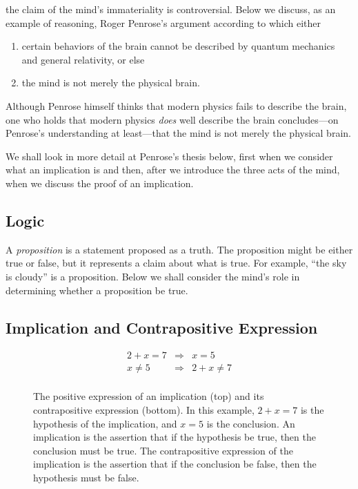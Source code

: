 the claim of the mind's immateriality is controversial.  Below we discuss, as
an example of reasoning, Roger Penrose's argument according to which either
\begin{enumerate}
   \item certain behaviors of the brain cannot be described by quantum
      mechanics and general relativity, or else
   \item the mind is not merely the physical brain.
\end{enumerate}
Although Penrose himself thinks that modern physics fails to describe the
brain, one who holds that modern physics \emph{does} well describe the brain
concludes---on Penrose's understanding at least---that the mind is not merely
the physical brain.

We shall look in more detail at Penrose's thesis below, first when we consider
what an implication is and then, after we introduce the three acts of the mind,
when we discuss the proof of an implication.

\subsection{Logic}

A \emph{proposition} is a statement proposed as a truth. The proposition might
be either true or false, but it represents a claim about what is true. For
example, ``the sky is cloudy'' is a proposition. Below we shall consider the
mind's role in determining whether a proposition be true.

\subsection{Implication and Contrapositive Expression}

\begin{figure}
   \begin{center}
      \begin{framed}
         \begin{eqnarray*}
            2 + x = 7 &\Rightarrow& x = 5\\
            x \neq 5  &\Rightarrow& 2 + x \neq 7\\
         \end{eqnarray*}
      \end{framed}
   \end{center}
   \caption{The positive expression of an implication (top) and its
      contrapositive expression (bottom). In this example, $2 + x = 7$ is the
      hypothesis of the implication, and $x = 5$ is the conclusion. An
      implication is the assertion that if the hypothesis be true, then the
      conclusion must be true. The contrapositive expression of the implication
      is the assertion that if the conclusion be false, then the hypothesis
      must be false.
   }
\label{fig:contrapositive}
\end{figure}

